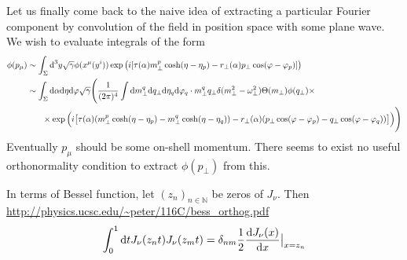 Let us finally come back to the naive idea of extracting a particular Fourier component by convolution of the field in position space with some plane wave. We wish to evaluate integrals of the form
\begin{subequations}
    \begin{align}
        \phi(p_\mu) & \sim\int_\Sigma\text{d}^3y\sqrt{\gamma}\phi(x^\mu(y^i))\exp\big({i}[\tau(\alpha) m_\perp^p\cosh(\eta-\eta_p)-r_\perp(\alpha) p_\perp\cos(\varphi-\varphi_p)]\big)                                                                       \\
                    & \sim\int_\Sigma\text{d}\alpha\text{d}\eta\text{d}\varphi\sqrt{\gamma}\Bigg(\frac{1}{{(2\pi)^4}}\int\text{d} m_\perp^q\text{d} q_\perp\text{d} \eta_q\text{d} \varphi_q\cdot m_\perp^q q_\perp\delta(m_\perp^2-\omega_\perp^2)\Theta(m_\perp)\phi(q_\perp)\times\nonumber \\
                    & \phantom{=}\quad\times\exp\Big({i}\big[\tau(\alpha) (m_\perp^p\cosh(\eta-\eta_p)-m_\perp^q\cosh(\eta-\eta_q))-r_\perp(\alpha) (p_\perp\cos(\varphi-\varphi_p)-q_\perp\cos(\varphi-\varphi_q))\big]\Big)\Bigg)
    \end{align}
\end{subequations}
Eventually $p_\mu$ should be some on-shell momentum. There seems to exist no useful orthonormality condition to extract $\phi(p_\perp)$ from this.

In terms of Bessel function, let $(z_n)_{n\in\mathbb{N}}$ be zeros of $J_\nu$. Then \url{http://physics.ucsc.edu/~peter/116C/bess_orthog.pdf}
\begin{equation}
    \int_0^1\text{d} tJ_\nu(z_nt)J_\nu(z_mt)=\delta_{nm}\frac{1}{2}\frac{\text{d} J_\nu(x)}{\text{d} x}\big\vert_{x=z_n}
\end{equation}
